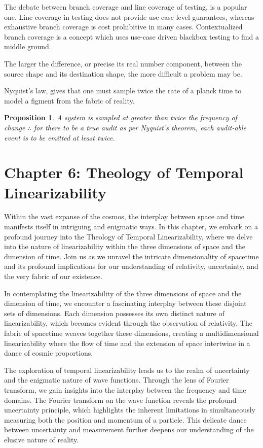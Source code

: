 \documentclass[ebook,12pt,oneside,openany]{memoir}
\newtheorem*{proposition}{Proposition} %
\begin{document}
\indent The debate between branch coverage and line coverage of testing, is a popular one. Line coverage in testing does not provide use-case level guarantees, whereas exhaustive branch coverage is cost prohibitive in many cases. Contextualized branch coverage is a concept which uses use-case driven blackbox testing to find a middle ground.

\indent The larger the difference, or precise its real number component, between the source shape and its destination shape, the more difficult a problem may be.

\indent Nyquist’s law, gives that one must sample twice the rate of a planck time to model a figment from the fabric of reality.

\indent \begin{proposition}
A system is sampled at greater than twice the frequency of change $\therefore$ for there to be a true audit as per Nyquist's theorem, each audit-able event is to be emitted at least twice.
\end{proposition}
\chapter*{Chapter 6: Theology of Temporal Linearizability}


\indent \indent Within the vast expanse of the cosmos, the interplay between space and time manifests itself in intriguing and enigmatic ways. In this chapter, we embark on a profound journey into the Theology of Temporal Linearizability, where we delve into the nature of linearizability within the three dimensions of space and the dimension of time. Join us as we unravel the intricate dimensionality of spacetime and its profound implications for our understanding of relativity, uncertainty, and the very fabric of our existence.

\indent In contemplating the linearizability of the three dimensions of space and the dimension of time, we encounter a fascinating interplay between these disjoint sets of dimensions. Each dimension possesses its own distinct nature of linearizability, which becomes evident through the observation of relativity. The fabric of spacetime weaves together these dimensions, creating a multidimensional linearizability where the flow of time and the extension of space intertwine in a dance of cosmic proportions.

\indent The exploration of temporal linearizability leads us to the realm of uncertainty and the enigmatic nature of wave functions. Through the lens of Fourier transform, we gain insights into the interplay between the frequency and time domains. The Fourier transform on the wave function reveals the profound uncertainty principle, which highlights the inherent limitations in simultaneously measuring both the position and momentum of a particle. This delicate dance between uncertainty and measurement further deepens our understanding of the elusive nature of reality.
\end{document}
